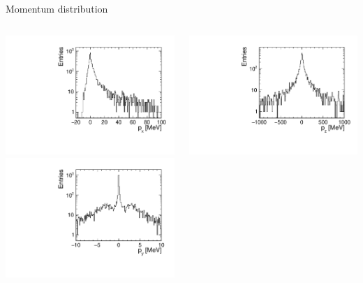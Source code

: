 \documentclass[aspectratio=169, hyperref={colorlinks=true,pdfpagelabels=false,linkcolor=black}, xcolor=dvipsnames,10pt]{beamer}
\begin{document}
\begin{frame}
	\begin{block}{Momentum distribution}
	\begin{columns}
		\centering
		\includegraphics[width=\textwidth]{../figures/incoherentPairs_px.pdf} \\									
		\centering
		\includegraphics[width=\textwidth]{../figures/incoherentPairs_py.pdf}
		 
		\centering
		\includegraphics[width=\textwidth]{../figures/incoherentPairs_pz.pdf} 
		\end{columns}	
	\end{block}
	

\end{frame}
\end{document}
